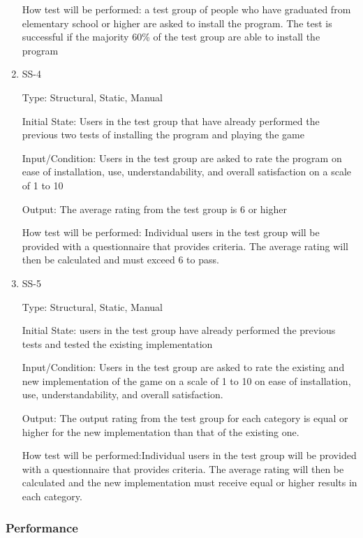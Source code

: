 \documentclass[12pt, titlepage]{article}
\begin{document}
\begin{enumerate}
How test will be performed:	a test group of people who have graduated from elementary school or higher are asked to install the program. The test is successful if the majority 60\%  of the test group are able to install the program   				
\item{SS-4\\}
\label{nfr:ss-4}

Type: Structural, Static, Manual
					
Initial State: Users in the test group that have already performed the previous two tests of installing the program and playing the game
					
Input/Condition: Users in the test group are asked to rate the program on ease of installation, use, understandability, and overall satisfaction on a scale of 1 to 10
					
Output: The average rating from the test group is 6 or higher
					
How test will be performed: Individual users in the test group will be provided with a questionnaire that provides criteria. The average rating will then be calculated and must exceed 6 to pass. 
					
\item{SS-5}
\label{nfr:ss-5}

Type: Structural, Static, Manual
					
Initial State: users in the test group have already performed the previous tests and tested the existing implementation
					
Input/Condition: Users in the test group are asked to rate the existing and new implementation of the game on a scale of 1 to 10 on ease of installation, use, understandability, and overall satisfaction. 
					
Output: The output rating from the test group for each category is equal or higher for the new implementation than that of the existing one. 
					
How test will be performed:Individual users in the test group will be provided with a questionnaire that provides criteria. The average rating will then be calculated and the new implementation must receive equal or higher results in each category. 
\end{enumerate}

\subsubsection{Performance}
\end{document}
